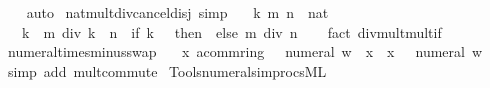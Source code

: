 \begin{isabellebody}
%
\isadelimproof
\ \ %
\endisadelimproof
%
\isatagproof
{}\isamarkupfalse%
\ auto%
\endisatagproof
{\isafoldproof}%
%
\isadelimproof
\isanewline
%
\endisadelimproof
\isanewline
{}\isamarkupfalse%
\ nat{\isacharunderscore}{\kern0pt}mult{\isacharunderscore}{\kern0pt}div{\isacharunderscore}{\kern0pt}cancel{\isacharunderscore}{\kern0pt}disj\ {\isacharbrackleft}{\kern0pt}simp{\isacharbrackright}{\kern0pt}{\isacharcolon}{\kern0pt}\isanewline
\ \ \ k\ m\ n\ {\isacharcolon}{\kern0pt}{\isacharcolon}{\kern0pt}\ nat\isanewline
\ \ \ {\isachardoublequoteopen}{\isacharparenleft}{\kern0pt}k\ {\isacharasterisk}{\kern0pt}\ m{\isacharparenright}{\kern0pt}\ div\ {\isacharparenleft}{\kern0pt}k\ {\isacharasterisk}{\kern0pt}\ n{\isacharparenright}{\kern0pt}\ {\isacharequal}{\kern0pt}\ {\isacharparenleft}{\kern0pt}if\ k\ {\isacharequal}{\kern0pt}\ {}\ then\ {}\ else\ m\ div\ n{\isacharparenright}{\kern0pt}{\isachardoublequoteclose}\isanewline
%
\isadelimproof
\ \ %
\endisadelimproof
%
\isatagproof
{}\isamarkupfalse%
\ {\isacharparenleft}{\kern0pt}fact\ div{\isacharunderscore}{\kern0pt}mult{\isacharunderscore}{\kern0pt}mult{}{\isacharunderscore}{\kern0pt}if{\isacharparenright}{\kern0pt}%
\endisatagproof
{\isafoldproof}%
%
\isadelimproof
\isanewline
%
\endisadelimproof
\isanewline
{}\isamarkupfalse%
\ numeral{\isacharunderscore}{\kern0pt}times{\isacharunderscore}{\kern0pt}minus{\isacharunderscore}{\kern0pt}swap{\isacharcolon}{\kern0pt}\isanewline
\ \ \ x{\isacharcolon}{\kern0pt}{\isacharcolon}{\kern0pt}\ {\isachardoublequoteopen}{\isacharprime}{\kern0pt}a{\isacharcolon}{\kern0pt}{\isacharcolon}{\kern0pt}comm{\isacharunderscore}{\kern0pt}ring{\isacharunderscore}{\kern0pt}{}{\isachardoublequoteclose}\ \ \ {\isachardoublequoteopen}numeral\ w\ {\isacharasterisk}{\kern0pt}\ {\isacharminus}{\kern0pt}x\ {\isacharequal}{\kern0pt}\ x\ {\isacharasterisk}{\kern0pt}\ {\isacharminus}{\kern0pt}\ numeral\ w{\isachardoublequoteclose}\isanewline
%
\isadelimproof
\ \ %
\endisadelimproof
%
\isatagproof
{}\isamarkupfalse%
\ {\isacharparenleft}{\kern0pt}simp\ add{\isacharcolon}{\kern0pt}\ mult{\isachardot}{\kern0pt}commute{\isacharparenright}{\kern0pt}%
\endisatagproof
{\isafoldproof}%
%
\isadelimproof
\isanewline
%
\endisadelimproof
%
\isadelimML
\isanewline
%
\endisadelimML
%
\isatagML
{}\isamarkupfalse%
\ {\isacartoucheopen}Tools{\isacharslash}{\kern0pt}numeral{\isacharunderscore}{\kern0pt}simprocs{\isachardot}{\kern0pt}ML{\isacartoucheclose}\isanewline

\end{isabellebody}
